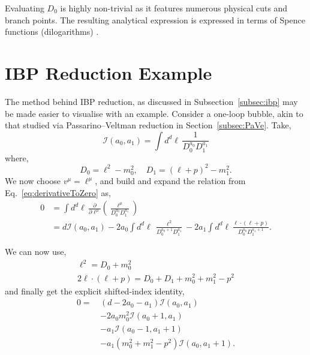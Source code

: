 Evaluating $D_0$ is highly non-trivial as it 
features numerous physical cuts and branch points. The resulting analytical 
expression is expressed in terms of Spence functions (dilogarithms) \cite{tHooft:1978xw}.


\section{IBP Reduction Example}\label{sec:IBPRedEx}

The method behind IBP reduction, as discussed in Subsection~\ref{subsec:ibp} 
may be made easier to visualise with an example. Consider a one-loop 
bubble, akin to that studied via Passarino--Veltman reduction in Section~\ref{subsec:PaVe}. 
Take,
\begin{equation}
    \mathcal I(a_0,a_1) = \int d^d\ell\,\frac{1}{D_0^{a_0}D_1^{a_1}}
\end{equation}
where,
\begin{equation}
    D_0 = \ell^2-m_0^2,\quad D_1 = (\ell + p)^2 - m_1^2.
\end{equation}
We now choose $v^\mu = \ell^\mu$, and build and expand the relation from 
Eq.~\eqref{eq:derivativeToZero} as,
\begin{equation}
    \begin{split}
        0 &= \int d^d\ell\,\frac\partial{\partial\ell^\mu}\left(\frac{\ell^\mu}{D_0^{a_0}D_1^{a_1}}\right)\\
          &= d\mathcal I(a_0,a_1) - 2a_0\int d^d\ell\,\frac{\ell^2}{D_0^{a_0+1}D_1^{a_1}}-2a_1\int d^d\ell\,\frac{\ell\cdot (\ell+p)}{D_0^{a_0}D_1^{a_1+1}}.
    \end{split}
\end{equation}

We can now use,
\begin{gather}
    \ell^2 = D_0 + m_0^2\\
    2\ell\cdot (\ell + p) = D_0 + D_1 + m_0^2 + m_1^2 - p^2
\end{gather}
and finally get the explicit shifted-index identity,
\begin{equation}
    \begin{split}
        0 = \,&(d-2a_0-a_1)\mathcal I(a_0,a_1)\\
            &- 2a_0m_0^2\mathcal I(a_0+1,a_1)\\
            &- a_1\mathcal I(a_0-1,a_1+1)\\
            &-a_1\!\left(m_0^2+m_1^2-p^2\right)\mathcal I(a_0, a_1+1).
    \end{split}
\end{equation}

